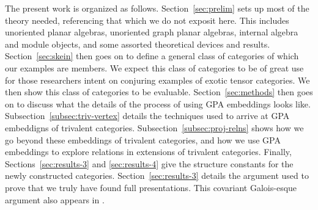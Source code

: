 
The present work is organized as follows.
Section~\ref{sec:prelim} sets up most of the theory needed, referencing that which we do not exposit here.
This includes unoriented planar algebras, unoriented graph planar algebras, 
internal algebra and module objects, and some assorted theoretical devices and results.
Section~\ref{sec:skein} then goes on to define a general class of categories of which our examples are members.
We expect this class of categories to be of great use for those researchers intent on conjuring 
examples of exotic tensor categories.
We then show this class of categories to be evaluable.
Section~\ref{sec:methods} then goes on to discuss what the details of the process of using GPA 
embeddings looks like.
Subsection~\ref{subsec:triv-vertex} details the techniques used to arrive at GPA embeddigns of 
trivalent categories. 
Subsection~\ref{subsec:proj-relns} shows how we go beyond these embeddings of trivalent categories,
and how we use GPA embeddings to explore relations in extensions of trivalent categories.
Finally, Sections~\ref{sec:results-3} and \ref{sec:results-4} give the structure constants for the 
newly constructed categories.
Section~\ref{sec:results-3} details the argument used to prove that we truly have found full presentations.
This covariant Galois-esque argument also appears in \cite{cain_noah_hans}.